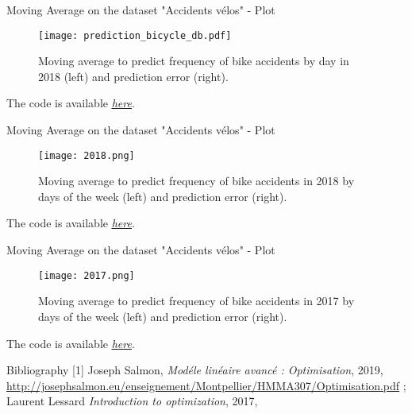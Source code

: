 \documentclass[unknownkeysallowed]{beamer}
\begin{document}
 \begin{frame}{Moving Average on the dataset "Accidents vélos" - Plot}
\begin{figure}[!h]
     \begin{center}
   \caption{\label{étiquette}Moving average to predict frequency of bike accidents by day in 2018 (left) and prediction error (right).}
   \texttt{[image: prediction\_bicycle\_db.pdf]}
   \end{center}
    \end{figure}
The code is available \href{https://github.com/Cindy-dotcom1/MLA/blob/master/Notebooks/bicycle_daily_accident_prediction.ipynb}{\textit{\underline{here}}}.
 \end{frame}
 \begin{frame}{Moving Average on the dataset "Accidents vélos" - Plot}
\begin{figure}[!h]
     \begin{center}
   \caption{\label{étiquette}Moving average to predict frequency of bike accidents in 2018 by days of the week (left) and prediction error (right).}
   \texttt{[image: 2018.png]}
   \end{center}
    \end{figure}
The code is available \href{https://github.com/Cindy-dotcom1/MLA/blob/master/Notebooks/Bicycle_2018.ipynb}{\textit{\underline{here}}}.
 \end{frame}
 \begin{frame}{Moving Average on the dataset "Accidents vélos" - Plot}
\begin{figure}[!h]
     \begin{center}
   \caption{\label{étiquette}Moving average to predict frequency of bike accidents in 2017 by days of the week (left) and prediction error (right).}
   \texttt{[image: 2017.png]}
   \end{center}
    \end{figure}
The code is available \href{https://github.com/Cindy-dotcom1/MLA/blob/master/Notebooks/Bicycle-2017.ipynb}{\textit{\underline{here}}}.
 \end{frame}
\begin{frame}{Bibliography}
[1] Joseph Salmon, \textit{Modéle linéaire avancé : Optimisation}, 2019, \url{http://josephsalmon.eu/enseignement/Montpellier/HMMA307/Optimisation.pdf} ; \\
[2] Laurent Lessard \textit{Introduction to optimization}, 2017, 

\printbibliography
\end{frame}
\end{document}
